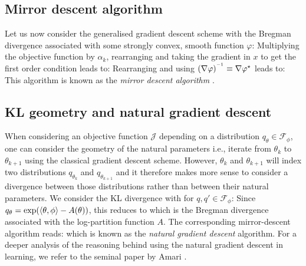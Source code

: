 \subsection{Mirror descent algorithm}
Let us now consider the generalised gradient descent scheme with the Bregman divergence associated with some strongly convex, smooth function $\varphi$:
Multiplying the objective function by $\alpha_{k}$, rearranging and taking the gradient in $x$ to get the first order condition leads to:
Rearranging and using $(\nabla \varphi)^{^{-1}}\equiv \nabla \varphi^{\star}$ leads to:
This algorithm is known as the \emph{mirror descent algorithm} \citep{beck03}. 

\subsection{KL geometry and natural gradient descent}
When considering an objective function $\mathcal J$ depending on a distribution $q_{\theta}\in\mathcal F_{\phi}$, one can consider the geometry of the natural parameters i.e., iterate from $\theta_{k}$ to $\theta_{k+1}$ using the classical gradient descent scheme. However, $\theta_{k}$ and $\theta_{k+1}$ will index two distributions $q_{\theta_{k}}$ and $q_{\theta_{k+1}}$ and it therefore makes more sense to consider a divergence between those distributions rather than between their natural parameters. 
We consider the KL divergence with for $q,q'\in\mathcal F_{\phi}$:
Since $q_{\theta}=\exp(\left\langle \theta,\phi \right\rangle-A(\theta))$, this reduces to
which is the Bregman divergence associated with the log-partition function $A$. The corresponding mirror-descent algorithm reads:
which is known as the \emph{natural gradient descent} algorithm. For a deeper analysis of the reasoning behind using the natural gradient descent in learning, we refer to the seminal paper by Amari \citep{amari98}.
